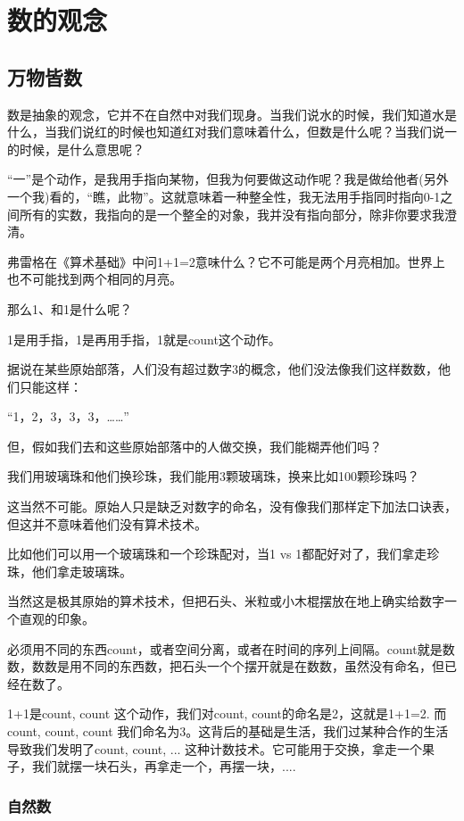 \section{数的观念}

\subsection{万物皆数}

数是抽象的观念，它并不在自然中对我们现身。当我们说水的时候，我们知道水是什么，当我们说红的时候也知道红对我们意味着什么，但数是什么呢？当我们说一的时候，是什么意思呢？

“一”是个动作，是我用手指向某物，但我为何要做这动作呢？我是做给他者(另外一个我)看的，“瞧，此物”。这就意味着一种整全性，我无法用手指同时指向0-1之间所有的实数，我指向的是一个整全的对象，我并没有指向部分，除非你要求我澄清。

弗雷格在《算术基础》中问1+1=2意味什么？它不可能是两个月亮相加。世界上也不可能找到两个相同的月亮。

那么1、和1是什么呢？

1是用手指，1是再用手指，1就是count这个动作。

据说在某些原始部落，人们没有超过数字3的概念，他们没法像我们这样数数，他们只能这样：

“1，2，3，3，3，……”

但，假如我们去和这些原始部落中的人做交换，我们能糊弄他们吗？

我们用玻璃珠和他们换珍珠，我们能用3颗玻璃珠，换来比如100颗珍珠吗？

这当然不可能。原始人只是缺乏对数字的命名，没有像我们那样定下加法口诀表，但这并不意味着他们没有算术技术。

比如他们可以用一个玻璃珠和一个珍珠配对，当1 vs 1都配好对了，我们拿走珍珠，他们拿走玻璃珠。

当然这是极其原始的算术技术，但把石头、米粒或小木棍摆放在地上确实给数字一个直观的印象。

必须用不同的东西count，或者空间分离，或者在时间的序列上间隔。count就是数数，数数是用不同的东西数，把石头一个个摆开就是在数数，虽然没有命名，但已经在数了。

1+1是count, count 这个动作，我们对count, count的命名是2，这就是1+1=2. 而count, count, count 我们命名为3。这背后的基础是生活，我们过某种合作的生活导致我们发明了count, count, ... 这种计数技术。它可能用于交换，拿走一个果子，我们就摆一块石头，再拿走一个，再摆一块，....

\subsubsection{自然数}

